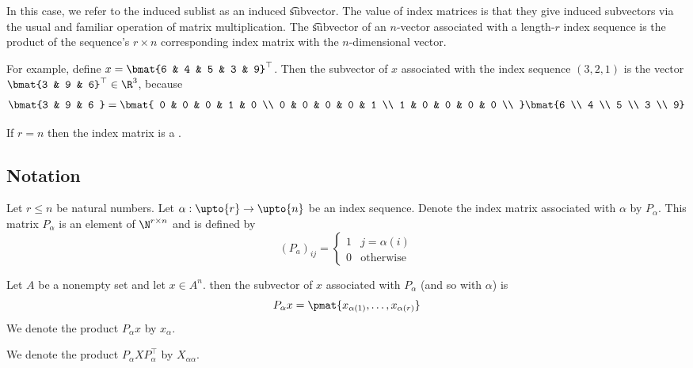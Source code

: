 In this case, we refer to the induced sublist as an induced \t{subvector}.
The value of index matrices is that they give induced subvectors via the usual and familiar operation of matrix multiplication.
The \t{subvector} of an $n$-vector associated with a length-$r$ index sequence is the product of the sequence's $r \times  n$ corresponding index matrix with the $n$-dimensional vector.

For example, define $x = \bmat{6 & 4 & 5 & 3 & 9}^\top $.
Then the subvector of $x$ associated with the index sequence $(3, 2, 1)$ is the vector $\bmat{3 & 9 & 6}^\top  \in \R ^3$, because
\[
\bmat{3 & 9 & 6 } =
\bmat{
0 & 0 & 0 & 1 & 0 \\
0 & 0 & 0 & 0 & 1 \\
1 & 0 & 0 & 0 & 0 \\
}\bmat{6 \\ 4 \\ 5 \\ 3 \\ 9}
\]

If $r = n$ then the index matrix is a .

\subsection*{Notation}

Let $r \leq n$ be natural numbers.
Let $\alpha : \upto{r} \to \upto{n}$ be an index sequence.
Denote the index matrix associated with $\alpha $ by $P_\alpha $.
This matrix $P_\alpha $ is an element of $\N  ^{r \times  n}$ and is defined by
\[
(P_a)_{ij} = \begin{cases}
1 & j = \alpha (i) \\
0 & \text{otherwise}
\end{cases}
\]

Let $A$ be a nonempty set and let $x \in A^n$.
then the subvector of $x$ associated with $P_\alpha $ (and so with $\alpha $) is
\[
P_\alpha  x = \pmat{x_{\alpha (1)}, \dots , x_{\alpha (r)}}
\]
We denote the product $P_\alpha x$ by $x_{\alpha }$.

We denote the product $P_\alpha  X P_\alpha ^\top $ by $X_{\alpha \alpha }$.
